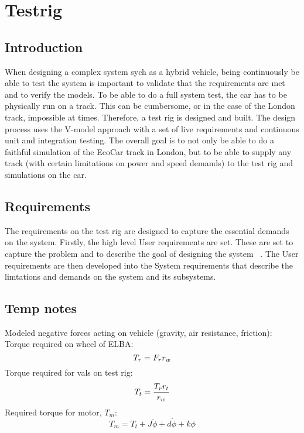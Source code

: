 \chapter{Testrig}
\section{Introduction}
When designing a complex system sych as a hybrid vehicle, being continuously be
able to test the system is important to validate that the requirements are met
and to verify the models. To be able to do a full system test, the car has to be
physically run on a track. This can be cumbersome, or in the case of the London
track, impossible at times. Therefore, a test rig is designed and built. The
design process uses the V-model approach with a set of live requirements and
continuous unit and integration testing. The overall goal is to not only be able
to do a faithful simulation of the EcoCar track in London, but to be able to
supply any track (with certain limitations on power and speed demands) to the
test rig and simulations on the car.

\section{Requirements}
The requirements on the test rig are designed to capture the essential demands
on the system. Firstly, the high level User requirements are set. These are set
to capture the problem and to describe the goal of designing the system
~\cite{ibm_req}. The User requirements are then developed into the System
requirements that describe the limtations and demands on the system and its
subsystems. 
\section{Temp notes}
Modeled negative forces acting on vehicle (gravity, air resistance, friction): 
Torque required on wheel of ELBA:$$T_r = F_r\*r_w$$
Torque required for vals on test rig: $$T_t = \frac{T_r\*r_t}{r_w}$$
Required torque for motor, $T_m$:
$$T_m = T_t + J\ddot{\phi} + d\dot{\phi} + k\phi$$

